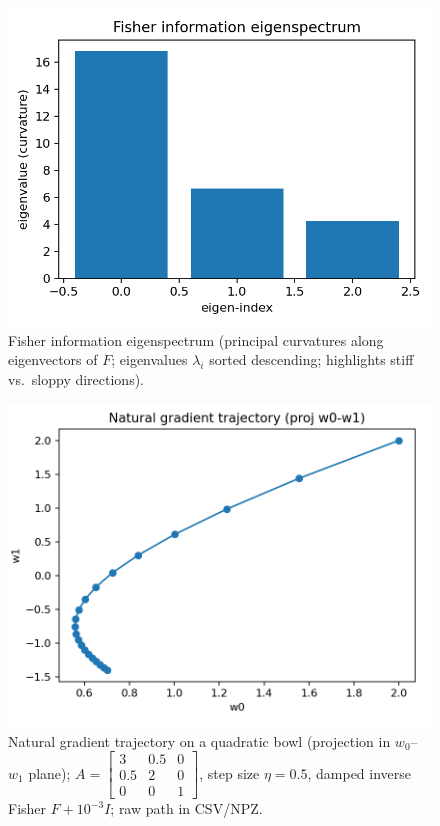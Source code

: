 \documentclass[
]{article}
\begin{document}
\begin{figure}
\hypertarget{fig:fim_eigenspectrum}{%
\centering
\includegraphics{../output/figures/fisher_information_eigenspectrum.png}
\caption{Fisher information eigenspectrum (principal curvatures along
eigenvectors of \(F\); eigenvalues \(\lambda_i\) sorted descending;
highlights stiff vs.~sloppy directions).}\label{fig:fim_eigenspectrum}
}
\end{figure}

\begin{figure}
\hypertarget{fig:natural_gradient_path}{%
\centering
\includegraphics{../output/figures/natural_gradient_path.png}
\caption{Natural gradient trajectory on a quadratic bowl (projection in
\(w_0\)--\(w_1\) plane);
\(A=\begin{bmatrix}3 & 0.5 & 0\\ 0.5 & 2 & 0\\ 0 & 0 & 1\end{bmatrix}\),
step size \(\eta=0.5\), damped inverse Fisher \(F + 10^{-3} I\); raw
path in CSV/NPZ.}\label{fig:natural_gradient_path}
}
\end{figure}
\end{document}
